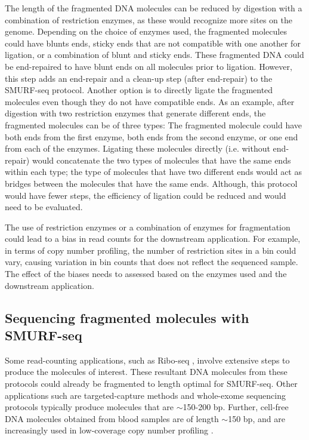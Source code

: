 The length of the fragmented DNA molecules can be reduced by digestion
with a combination of restriction enzymes, as these would recognize more
sites on the genome. Depending on the choice of enzymes used, the
fragmented molecules could have blunts ends, sticky ends that are not
compatible with one another for ligation, or a combination of blunt and
sticky ends.
%
These fragmented DNA could be end-repaired to have blunt ends on all
molecules prior to ligation. However, this step adds an end-repair and a
clean-up step (after end-repair) to the SMURF-seq protocol.
%
Another option is to directly ligate the fragmented molecules even
though they do not have compatible ends. As an example, after digestion
with two restriction enzymes that generate different ends, the
fragmented molecules can be of three types: The fragmented molecule
could have both ends from the first enzyme, both ends from the second
enzyme, or one end from each of the enzymes. Ligating these molecules
directly (i.e. without end-repair) would concatenate the two types of
molecules that have the same ends within each type; the type of
molecules that have two different ends would act as bridges between the
molecules that have the same ends. Although, this protocol would have
fewer steps, the efficiency of ligation could be reduced and would need
to be evaluated.

The use of restriction enzymes or a combination of enzymes for
fragmentation could lead to a bias in read counts for the downstream
application. For example, in terms of copy number profiling, the number
of restriction sites in a bin could vary, causing variation in bin
counts that does not reflect the sequenced sample. The effect of the
biases needs to assessed based on the enzymes used and the downstream
application.


\subsection*{Sequencing fragmented molecules with SMURF-seq}
Some read-counting applications, such as Ribo-seq
\citep{ingolia2009genome}, involve extensive steps to produce the
molecules of interest. These resultant DNA molecules from these
protocols could already be fragmented to length optimal for SMURF-seq.
Other applications such are targeted-capture methods and whole-exome
sequencing protocols typically produce molecules that are $\sim$150-200
bp. Further, cell-free DNA molecules obtained from blood samples are of
length $\sim$150 bp, and are increasingly used in low-coverage copy
number profiling \citep{underhill2016fragment,
adalsteinsson2017scalable}.

